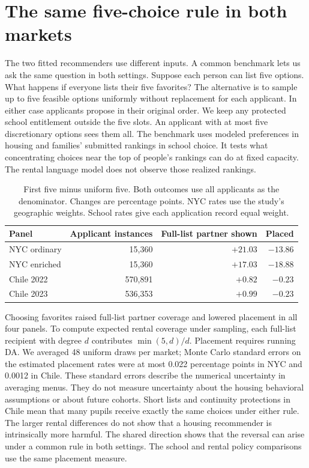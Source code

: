 \section{The same five-choice rule in both markets}\label{sec:common}
The two fitted recommenders use different inputs. A common benchmark lets us ask the same question in both settings. Suppose each person can list five options. What happens if everyone lists their five favorites? The alternative is to sample up to five feasible options uniformly without replacement for each applicant. In either case applicants propose in their original order. We keep any protected school entitlement outside the five slots. An applicant with at most five discretionary options sees them all. The benchmark uses modeled preferences in housing and families' submitted rankings in school choice. It tests what concentrating choices near the top of people's rankings can do at fixed capacity. The rental language model does not observe those realized rankings.

\begin{table}[ht]\centering\small
\caption{First five minus uniform five. Both outcomes use all applicants as the denominator. Changes are percentage points. NYC rates use the study's geographic weights. School rates give each application record equal weight.}\label{tab:common}
\begin{tabular}{@{}lrrr@{}}\toprule
Panel & Applicant instances & Full-list partner shown & Placed\\\midrule
NYC ordinary & 15,360 & $+21.03$ & $-13.86$\\
NYC enriched & 15,360 & $+17.03$ & $-18.88$\\
Chile 2022 & 570,891 & $+0.82$ & $-0.23$\\
Chile 2023 & 536,353 & $+0.99$ & $-0.23$\\\bottomrule
\end{tabular}
\end{table}

Choosing favorites raised full-list partner coverage and lowered placement in all four panels. To compute expected rental coverage under sampling, each full-list recipient with degree $d$ contributes $\min(5,d)/d$. Placement requires running DA. We averaged 48 uniform draws per market; Monte Carlo standard errors on the estimated placement rates were at most 0.022 percentage points in NYC and 0.0012 in Chile. These standard errors describe the numerical uncertainty in averaging menus. They do not measure uncertainty about the housing behavioral assumptions or about future cohorts. Short lists and continuity protections in Chile mean that many pupils receive exactly the same choices under either rule. The larger rental differences do not show that a housing recommender is intrinsically more harmful. The shared direction shows that the reversal can arise under a common rule in both settings. The school and rental policy comparisons use the same placement measure.

